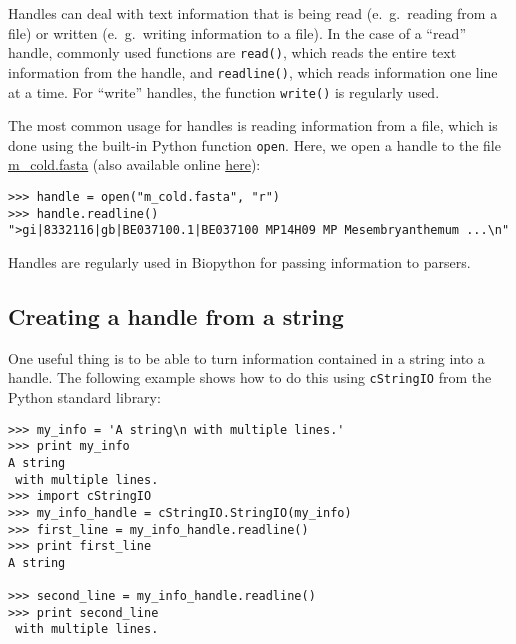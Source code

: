 \documentclass{report}
\begin{document}
Handles can deal with text information that is being read (e.~g.~reading
from a file) or written (e.~g.~writing information to a file). In the
case of a ``read'' handle, commonly used functions are \verb|read()|,
which reads the entire text information from the handle, and
\verb|readline()|, which reads information one line at a time. For
``write'' handles, the function \verb|write()| is regularly used.

The most common usage for handles is reading information from a file,
which is done using the built-in Python function \verb|open|. Here, we open a
handle to the file \href{examples/m\_cold.fasta}{m\_cold.fasta}
(also available online
\href{http://biopython.org/DIST/docs/tutorial/examples/m\_cold.fasta}{here}):

\begin{verbatim}
>>> handle = open("m_cold.fasta", "r")
>>> handle.readline()
">gi|8332116|gb|BE037100.1|BE037100 MP14H09 MP Mesembryanthemum ...\n"
\end{verbatim}

Handles are regularly used in Biopython for passing information to parsers.

\subsection{Creating a handle from a string}

One useful thing is to be able to turn information contained in a
string into a handle. The following example shows how to do this using
\verb|cStringIO| from the Python standard library:

\begin{verbatim}
>>> my_info = 'A string\n with multiple lines.'
>>> print my_info
A string
 with multiple lines.
>>> import cStringIO
>>> my_info_handle = cStringIO.StringIO(my_info)
>>> first_line = my_info_handle.readline()
>>> print first_line
A string

>>> second_line = my_info_handle.readline()
>>> print second_line
 with multiple lines.
\end{verbatim}
\end{document}
